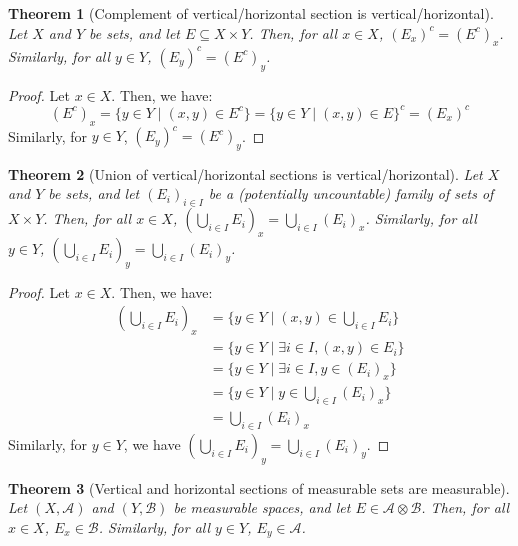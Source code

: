\documentclass{article}
\newtheorem{theorem}{Theorem}[section]
\theoremstyle{definition}
\theoremstyle{remark}
\theoremstyle{example}
\theoremstyle{notation}
\begin{document}
\begin{theorem}[Complement of vertical/horizontal section is vertical/horizontal] \label{thm:complement-section-is-section}
		Let $X$ and $Y$ be sets, and let $E \subseteq X \times Y$. Then, for all $x \in X$, $(E_x)^c = (E^c)_x$. Similarly, for all $y \in Y$, $(E_y)^c = (E^c)_y$.
\end{theorem}

\begin{proof}
		Let $x \in X$. Then, we have:
				$$(E^c)_x = \{y \in Y \mid (x, y) \in E^c\} = \{y \in Y \mid (x, y) \in E\}^c = (E_x)^c$$
		Similarly, for $y \in Y$, $(E_y)^c = (E^c)_y$.
\end{proof}

\begin{theorem}[Union of vertical/horizontal sections is vertical/horizontal] \label{thm:union-section-is-section}
		Let $X$ and $Y$ be sets, and let $(E_i)_{i \in I}$ be a (potentially uncountable) family of sets of $X \times Y$. Then, for all $x \in X$, $(\bigcup_{i \in I} E_i)_x = \bigcup_{i \in I} (E_i)_x$. Similarly, for all $y \in Y$, $(\bigcup_{i \in I} E_i)_y = \bigcup_{i \in I} (E_i)_y$.
\end{theorem}

\begin{proof}
		Let $x \in X$. Then, we have:
		\begin{align*}
								(\bigcup_{i \in I} E_i)_x &= \{y \in Y \mid (x, y) \in \bigcup_{i \in I} E_i\}\\
														  &= \{y \in Y \mid \exists i \in I, (x, y) \in E_i\}\\
														  &= \{y \in Y \mid \exists i \in I, y \in (E_i)_x\}\\
														  &= \{y \in Y \mid y \in \bigcup_{i \in I} (E_i)_x\}\\
														  &= \bigcup_{i \in I} (E_i)_x
		\end{align*}
		Similarly, for $y \in Y$, we have $(\bigcup_{i \in I} E_i)_y = \bigcup_{i \in I} (E_i)_y$.
\end{proof}

\begin{theorem}[Vertical and horizontal sections of measurable sets are measurable] \label{thm:vertical-section-measurable-set-is-measurable} %
		Let $(X, \mathcal{A})$ and $(Y, \mathcal{B})$ be measurable spaces, and let $E \in \mathcal{A} \otimes \mathcal{B}$. Then, for all $x \in X$, $E_x \in \mathcal{B}$. Similarly, for all $y \in Y$, $E_y \in \mathcal{A}$.
\end{theorem}
\end{document}
